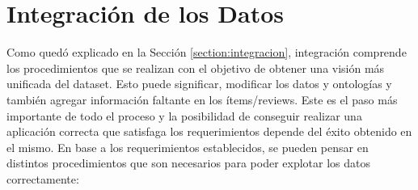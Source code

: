 \chapter{Integración de los Datos}
\label{chapter:integracion}

Como quedó explicado en la Sección \ref{section:integracion}, integración comprende los procedimientos que se realizan con el objetivo de obtener una
visión más unificada del dataset.
Esto puede significar, modificar los datos y ontologías y también agregar información faltante en los ítems/reviews.
Este es el paso más importante de todo el proceso y la posibilidad de conseguir realizar una aplicación correcta que satisfaga los requerimientos
depende del éxito obtenido en el mismo.
En base a los requerimientos establecidos, se pueden pensar en distintos procedimientos que son necesarios para poder explotar los datos
correctamente:
\\
\\

